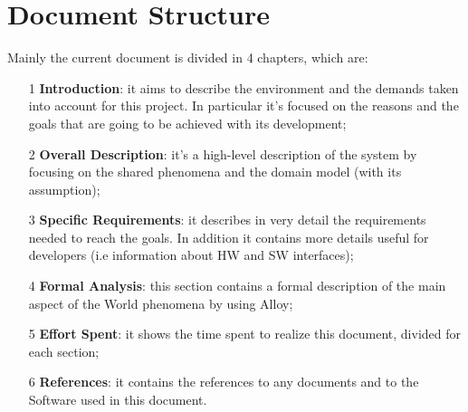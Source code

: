 \section{Document Structure}
Mainly the current document is divided in 4 chapters, which are:
\begin{itemize}
\item[1]\textbf{Introduction}: it aims to describe the environment and the demands taken into account for this project. In particular it's focused on the reasons and the goals that are going to be achieved with its development;
\item[2]\textbf{Overall Description}: it's a high-level description of the system by focusing on the shared phenomena and the domain model (with its assumption); 
\item[3]\textbf{Specific Requirements}: it describes in very detail the requirements needed to reach the goals. In addition it contains more details useful for developers (i.e information about HW and SW interfaces);
\item[4]\textbf{Formal Analysis}: this section contains a formal description of the main aspect of the World phenomena by using Alloy;
\item[5]\textbf{Effort Spent}: it shows the time spent to realize this document, divided for each section;
\item[6]\textbf{References}: it contains the references to any documents and to the Software used in this document.
\end{itemize}

